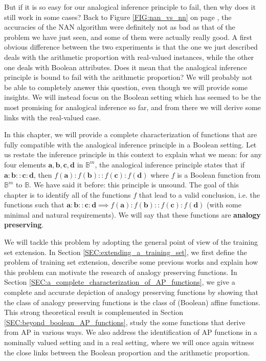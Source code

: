 But if it is so easy for our analogical inference principle to fail, then why
does it still work in some cases? Back to Figure \ref{FIG:nan_vs_nn} on page
\pageref{FIG:nan_vs_nn}, the accuracies of the NAN algorithm were definitely
not as bad as that of the problem we have just seen, and some of them were
actually really good. A first obvious difference between the two experiments is
that the one we just described deals with the arithmetic proportion with
real-valued instances, while the other one deals with Boolean attributes. Does
it mean that the analogical inference principle is bound to fail with the
arithmetic proportion? We will probably not be able to completely answer this
question, even though we will provide some insights.  We will instead focus on
the Boolean setting which has seemed to be the most promising for analogical
inference so far, and from there we will derive some links with the real-valued
case.

In this chapter, we will provide a complete characterization of functions that
are fully compatible with the analogical inference principle in a Boolean
setting. Let us restate the inference principle in this context to explain what
we mean: for any four elements $\mathbf{a}, \mathbf{b}, \mathbf{c}, \mathbf{d}$
in $\mathbb{B}^m$, the analogical inference principle states that if
$\mathbf{a}: \mathbf{b}:: \mathbf{c}: \mathbf{d}$, then $f(\mathbf{a}):
f(\mathbf{b}):: f(\mathbf{c}): f(\mathbf{d})$ where $f$ is a Boolean function
from $\mathbb{B}^m$ to $\mathbb{B}$. We have said it before:  this principle is
unsound. The goal of this chapter is to identify all of the functions $f$ that
lead to a valid conclusion, i.e. the functions such that $\mathbf{a}:
\mathbf{b}:: \mathbf{c}: \mathbf{d} \implies f(\mathbf{a}):f(\mathbf{b})::
f(\mathbf{c}): f(\mathbf{d})$ (with some minimal and natural requirements). We
will say that these functions are \textbf{analogy preserving}.

We will tackle this problem by adopting the general point of view of  the
training set extension. In Section \ref{SEC:extending_a_training_set}, we first
define the problem of training set extension, describe some previous works and
explain how this problem can motivate the research of analogy preserving
functions. In Section \ref{SEC:a_complete_characterization_of_AP_functions}, we
give a complete and accurate depiction of analogy preserving functions by
showing that the class of analogy preserving functions is the class of
(Boolean) affine functions. This strong theoretical result is complemented in
Section \ref{SEC:beyond_boolean_AP_functions}, study the some functions that
derive from AP in various ways. We also address the identification of AP
functions in a nominally valued setting and in a real setting, where we will
once again witness the close links between the Boolean proportion and the
arithmetic proportion.

